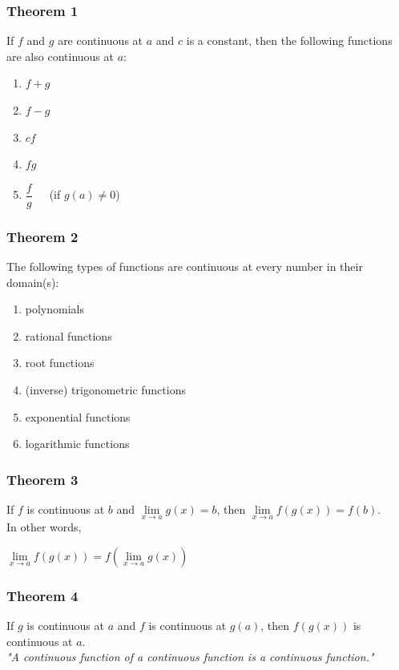 \begin{frame}
    \frametitle{Theorem 1}
    If $f$ and $g$ are continuous at $a$ and $c$ is a constant, then the following functions are also continuous at $a$:
    \begin{enumerate}
        \item $f + g$
        \item $f - g$
        \item $cf$
        \item $fg$
        \item $\dfrac{f}{g}$\ \ \ \alert{(if $g(a) \neq 0$)}
    \end{enumerate}
\end{frame}
\begin{frame}
    \frametitle{Theorem 2}
    The following types of functions are continuous at every number in their domain(s):
    \begin{enumerate}
        \item polynomials
        \item rational functions
        \item root functions
        \item (inverse) trigonometric functions
        \item exponential functions
        \item logarithmic functions
    \end{enumerate}
\end{frame}
\begin{frame}
    \frametitle{Theorem 3}
    If $f$ is continuous at $b$ and $\lim\limits_{\textit{x} \to a}g(x) = b$, then $\lim\limits_{\textit{x} \to a}f(g(x))=f(b)$.\\
    \bigskip
    In other words,
    \begin{center}
        $\lim\limits_{\textit{x} \to a}f(g(x))=f(\lim\limits_{\textit{x} \to a}g(x))$
    \end{center}
\end{frame}
\begin{frame}
    \frametitle{Theorem 4}
    If $g$ is continuous at $a$ and $f$ is continuous at $g(a)$, then $f(g(x))$ is continuous at $a$.\\
    \bigskip
    \bigskip
    \textit{"A continuous function of a continuous function is a continuous function."}
\end{frame}
